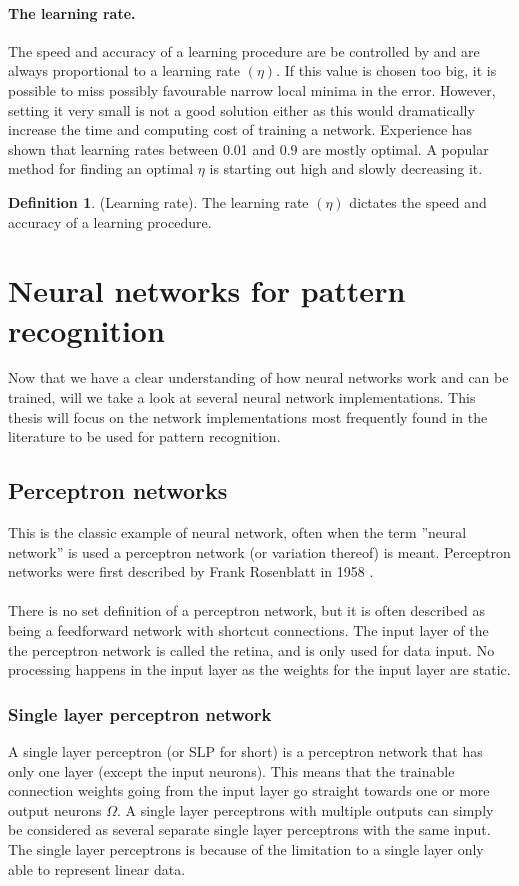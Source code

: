 \documentclass[pdftex,a4paper,12pt,twoside]{report}
\theoremstyle{plain} \newtheorem{theorem}{Theorem} \newtheorem{proposition}{Proposition} \newtheorem{lemma}{Lemma} \newtheorem*{corollary}{Corollary}
\theoremstyle{definition} \newtheorem{definition}{Definition} \newtheorem{conjecture}{Conjecture} \newtheorem*{example}{Example} \newtheorem{algorithm}{Algorithm}
\theoremstyle{remark} \newtheorem*{remark}{Remark} \newtheorem*{note}{Note} \newtheorem{case}{Case}
\begin{document}
\paragraph{The learning rate.}
The speed and accuracy of a learning procedure are be controlled by and are always proportional to a learning rate $(\eta)$. If this value is chosen too big, it is possible to miss possibly favourable narrow local minima in the error. However, setting it very small is not a good solution either as this would dramatically increase the time and computing cost of training a network. Experience has shown that learning rates between 0.01 and 0.9 are mostly optimal. A popular method for finding an optimal $\eta$ is starting out high and slowly decreasing it.
\begin{definition}
(Learning rate). The learning rate $(\eta)$ dictates the speed and accuracy of a learning procedure.
\end{definition}
\section{Neural networks for pattern recognition}
Now that we have a clear understanding of how neural networks work and can be trained, will we take a look at several neural network implementations. This thesis will focus on the network implementations most frequently found in the literature to be used for pattern recognition.
\subsection{Perceptron networks}
This is the classic example of neural network, often when the term ''neural network'' is used a perceptron network (or variation thereof) is meant. Perceptron networks were first described by Frank Rosenblatt in 1958 \citep{Rosenblat1958}. \\\\There is no set definition of a perceptron network, but it is often described as being a feedforward network with shortcut connections. The input layer of the the perceptron network is called the retina, and is only used for data input. No processing happens in the input layer as the weights for the input layer are static.
\subsubsection{Single layer perceptron network}
A single layer perceptron (or SLP for short) is a perceptron network that has only one layer (except the input neurons). This means that the trainable connection weights going from the input layer go straight towards one or more output neurons $\Omega$. A single layer perceptrons with multiple outputs can simply be considered as several separate single layer perceptrons with the same input. The single layer perceptrons is because of the limitation to a single layer only able to represent linear data.
\end{document}
